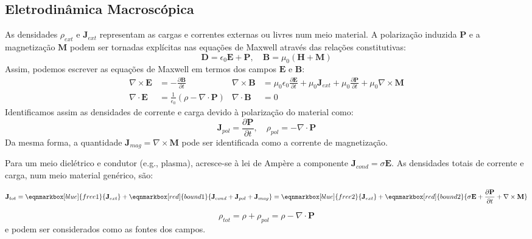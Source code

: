 \subsection{Eletrodinâmica Macroscópica}

As densidades $\rho_{ext}$ e $\mathbf{J}_{ext}$ representam as cargas e correntes externas ou livres num meio material. A polarização induzida $\mathbf{P}$ e a magnetização $\mathbf{M}$ podem ser tornadas explícitas nas equações de Maxwell através das relações constitutivas:
$$
    \mathbf{D} = \epsilon_0 \mathbf{E} + \mathbf{P}, \quad \mathbf{B} = \mu_0 (\mathbf{H} + \mathbf{M})
$$
Assim, podemos escrever as equações de Maxwell em termos dos campos $\mathbf{E}$ e $\mathbf{B}$:
$$
    \begin{aligned}
        \nabla \times \mathbf{E} &= -\frac{\partial \mathbf{B}}{\partial t}
        &
        \nabla \times \mathbf{B} &= \mu_0 \epsilon_0 \frac{\partial \mathbf{E}}{\partial t} + \mu_0 \mathbf{J}_{ext} + \mu_0 \frac{\partial \mathbf{P}}{\partial t} + \mu_0 \nabla \times \mathbf{M}
        \\
        \nabla \cdot \mathbf{E} &= \frac{1}{\epsilon_0} (\rho - \nabla \cdot \mathbf{P})
        &
        \nabla \cdot \mathbf{B} &= 0
    \end{aligned}
$$
Identificamos assim as densidades de corrente e carga devido à polarização do material como: 
$$
    \mathbf{J}_{pol} = \frac{\partial \mathbf{P}}{\partial t}, \quad \rho_{pol} = -\nabla \cdot \mathbf{P}
$$
Da mesma forma, a quantidade $\mathbf{J}_{mag} = \nabla \times \mathbf{M}$ pode ser identificada como a corrente de magnetização. 

Para um meio dielétrico e condutor (e.g., plasma), acresce-se à lei de Ampère a componente $\mathbf{J}_{cond} = \sigma \mathbf{E}$. As densidades totais de corrente e carga, num meio material genérico, são:

$$
    \mathbf{J}_{tot} 
    = 
    \eqnmarkbox[blue]{free1}{\mathbf{J}_{ext}} + \eqnmarkbox[red]{bound1}{\mathbf{J}_{cond} + \mathbf{J}_{pol} + \mathbf{J}_{mag}}
    = 
    \eqnmarkbox[blue]{free2}{\mathbf{J}_{ext}} + \eqnmarkbox[red]{bound2}{\sigma \mathbf{E} + \frac{\partial \mathbf{P}}{\partial t} + \nabla \times \mathbf{M}}
$$

\vspace*{-0.75em}
$$
    \rho_{tot} = \rho + \rho_{pol} = \rho - \nabla \cdot \mathbf{P}
$$
e podem ser considerados como as fontes dos campos.

